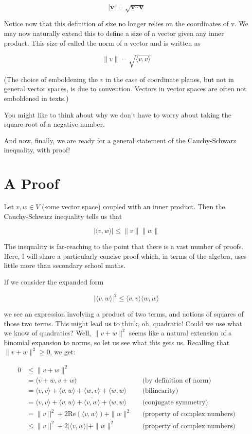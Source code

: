 \documentclass{article}
\begin{document}
\[
|\mathbf{v}| = \sqrt{\mathbf{v} \cdot \mathbf{v}}
\]

Notice now that this definition of size no longer relies on the coordinates of v. We may now naturally extend this to define a size of a vector given any inner product. This size of called the norm of a vector and is written as

\[
\|v\| = \sqrt{\langle v, v \rangle}
\]

(The choice of emboldening the $v$ in the case of coordinate planes, but not in general vector spaces, is due to convention. Vectors in vector spaces are often not emboldened in texts.)

You might like to think about why we don't have to worry about taking the square root of a negative number.

And now, finally, we are ready for a general statement of the Cauchy-Schwarz inequality, with proof!

\section*{A Proof}

Let $v, w \in V$ (some vector space) coupled with an inner product. Then the Cauchy-Schwarz inequality tells us that

\[
|\langle v, w \rangle| \leq \|v\| \|w\|
\]

The inequality is far-reaching to the point that there is a vast number of proofs. Here, I will share a particularly concise proof which, in terms of the algebra, uses little more than secondary school maths.

If we consider the expanded form

\[
|\langle v,w \rangle|^2 \leq \langle v,v \rangle \langle w,w \rangle
\]

we see an expression involving a product of two terms, and notions of squares of those two terms. This might lead us to think, oh, quadratic! Could we use what we know of quadratics? Well, $\|v+w\|^2$ seems like a natural extension of a binomial expansion to norms, so let us see what this gets us. Recalling that $\|v+w\|^2 \geq 0$, we get:

\begin{align*}
0 &\leq \|v+w\|^2
    && \\
  &= \langle v+w, v+w \rangle
    && \text{(by definition of norm)} \\
  &= \langle v, v \rangle + \langle v, w \rangle + \langle w, v \rangle + \langle w, w \rangle
    && \text{(bilinearity)} \\
  &= \langle v, v \rangle + \langle v, w \rangle + \overline{\langle v, w \rangle} + \langle w, w \rangle
    && \text{(conjugate symmetry)} \\
  &= \|v\|^2 + 2\mathrm{Re}(\langle v, w \rangle) + \|w\|^2
    && \text{(property of complex numbers)} \\
  &\leq \|v\|^2 + 2|\langle v, w \rangle| + \|w\|^2
    && \text{(property of complex numbers)}
\end{align*}
\end{document}

